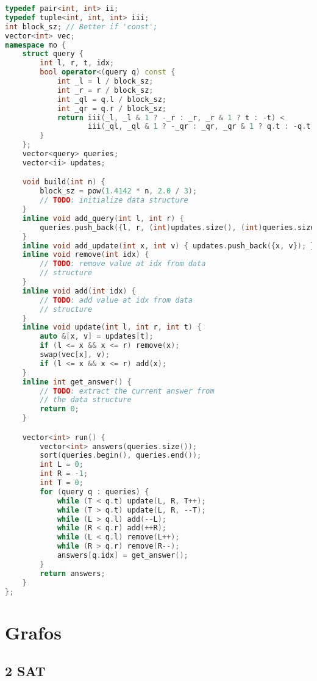\documentclass[10pt, a4paper, oneside]{book}
\begin{document}
\begin{lstlisting}[language=C++]
typedef pair<int, int> ii;
typedef tuple<int, int, int> iii;
int block_sz; // Better if 'const';
vector<int> vec;
namespace mo {
    struct query {
        int l, r, t, idx;
        bool operator<(query q) const {
            int _l = l / block_sz;
            int _r = r / block_sz;
            int _ql = q.l / block_sz;
            int _qr = q.r / block_sz;
            return iii(_l, _l & 1 ? -_r : _r, _r & 1 ? t : -t) <
                   iii(_ql, _ql & 1 ? -_qr : _qr, _qr & 1 ? q.t : -q.t);
        }
    };
    vector<query> queries;
    vector<ii> updates;

    void build(int n) {
        block_sz = pow(1.4142 * n, 2.0 / 3);
        // TODO: initialize data structure
    }
    inline void add_query(int l, int r) {
        queries.push_back({l, r, (int)updates.size(), (int)queries.size()});
    }
    inline void add_update(int x, int v) { updates.push_back({x, v}); }
    inline void remove(int idx) {
        // TODO: remove value at idx from data
        // structure
    }
    inline void add(int idx) {
        // TODO: add value at idx from data
        // structure
    }
    inline void update(int l, int r, int t) {
        auto &[x, v] = updates[t];
        if (l <= x && x <= r) remove(x);
        swap(vec[x], v);
        if (l <= x && x <= r) add(x);
    }
    inline int get_answer() {
        // TODO: extract the current answer from
        // the data structure
        return 0;
    }

    vector<int> run() {
        vector<int> answers(queries.size());
        sort(queries.begin(), queries.end());
        int L = 0;
        int R = -1;
        int T = 0;
        for (query q : queries) {
            while (T < q.t) update(L, R, T++);
            while (T > q.t) update(L, R, --T);
            while (L > q.l) add(--L);
            while (R < q.r) add(++R);
            while (L < q.l) remove(L++);
            while (R > q.r) remove(R--);
            answers[q.idx] = get_answer();
        }
        return answers;
    }
};
\end{lstlisting}
\hfill

\newpage

%
%
%
%

\chapter{Grafos}

\section{2 SAT}
\end{document}
